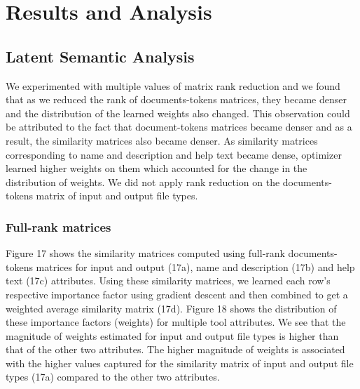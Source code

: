 \chapter{Results and Analysis}
\section{Latent Semantic Analysis}
We experimented with multiple values of matrix rank reduction and we found that as we reduced the rank of documents-tokens matrices, they became denser and the distribution of the learned weights also changed. This observation could be attributed to the fact that document-tokens matrices became denser and as a result, the similarity matrices also became denser. As similarity matrices corresponding to name and description and help text became dense, optimizer learned higher weights on them which accounted for the change in the distribution of weights. We did not apply rank reduction on the documents-tokens matrix of input and output file types.

\subsection{Full-rank matrices}
Figure 17 shows the similarity matrices computed using full-rank documents-tokens matrices for input and output (17a), name and description (17b) and help text (17c) attributes. Using these similarity matrices, we learned each row's respective importance factor using gradient descent and then combined to get a weighted average similarity matrix (17d). Figure 18 shows the distribution of these importance factors (weights) for multiple tool attributes. We see that the magnitude of weights estimated for input and output file types is higher than that of the other two attributes. The higher magnitude of weights is associated with the higher values captured for the similarity matrix of input and output file types (17a) compared to the other two attributes.


